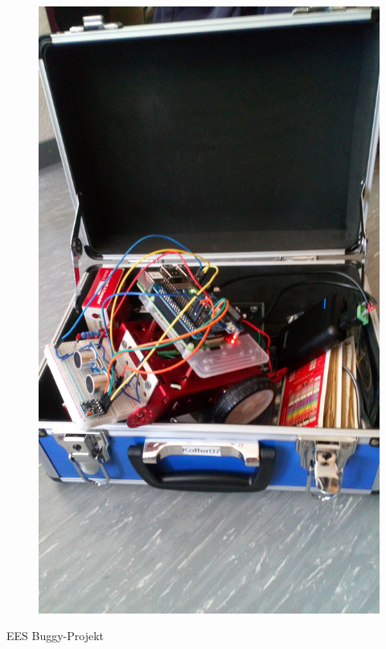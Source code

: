 \documentclass[12pt]{report}
\begin{document}
\begin{titlepage}
\begin{center}
        \begin{figure}[H]
          \centering
          \captionsetup[subfigure]{labelformat=empty}
          \includegraphics[width=\linewidth, angle=-90]{lernportfolio_assets/BuggyZusammengebaut.JPG}
        \end{figure}
        \vspace{0.8cm}
        EES Buggy-Projekt 
        \pagebreak
    \end{center}
\end{titlepage}
\end{document}

